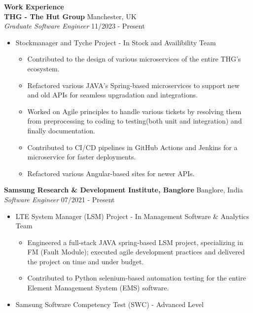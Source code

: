 \documentclass{article}
\begin{document}
\noindent \large \textbf{\textcolor{NavyBlue}{Work Experience}} \vspace{3pt} \\
\noindent \normalsize \textbf{THG - The Hut Group} \hfill Manchester, UK \\
\textit{Graduate Software Engineer} \hfill 11/2023 - Present
\begin{itemize}[noitemsep,nolistsep,leftmargin=*]
    \item {\normalsize {Stockmanager and Tyche Project - In Stock and Availibility Team }
        \begin{itemize}
            \item Contributed to the design of various microservices of the entire THG's ecosystem.
            \item Refactored various JAVA's Spring-based microservices to support new and old APIs for seamless upgradation and integrations.
            \item Worked on Agile principles to handle various tickets by resolving them from preprocessing to coding to testing(both unit and integration) and finally documentation.
            \item Contributed to CI/CD pipelines in GitHub Actions and Jenkins for a microservice for faster deployments.
            \item Refactored various Angular-based sites for newer APIs.
        \end{itemize}
    }
\end{itemize}
\noindent \normalsize \textbf{Samsung Research \& Development Institute, Banglore} \hfill Banglore, India  \\
\textit{Software Engineer} \hfill 07/2021 - Present
\begin{itemize}[noitemsep,nolistsep,leftmargin=*]
    \item {\normalsize {LTE System Manager (LSM) Project - In Management Software \& Analytics Team }
        \begin{itemize}
            \item Engineered a full-stack JAVA spring-based LSM project, specializing in FM (Fault Module); executed agile development practices and delivered the project on time and under budget.
            \item Contributed to Python selenium-based automation testing for the entire Element Management System (EMS) software.
        \end{itemize}
    }
    \item {\normalsize {Samsung Software Competency Test (SWC) - Advanced Level}}
\end{itemize}
\end{document}
